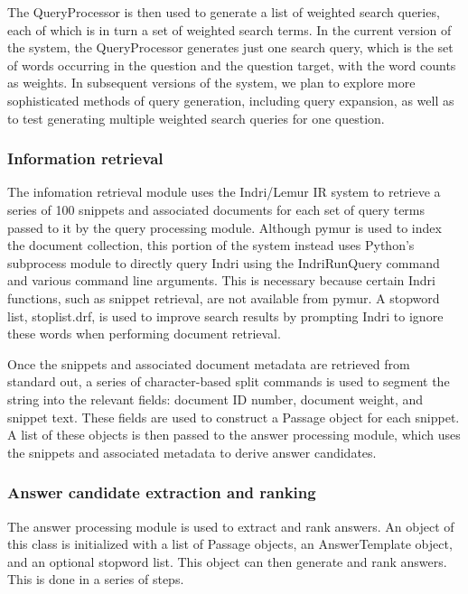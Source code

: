 \documentclass[11pt]{article}
\begin{document}
The QueryProcessor is then used to generate a list of weighted search queries, each of which is in turn a set of weighted search terms. In the current version of the system, the QueryProcessor generates just one search query, which is the set of words occurring in the question and the question target, with the word counts as weights. In subsequent versions of the system, we plan to explore more sophisticated methods of query generation, including query expansion, as well as to test generating multiple weighted search queries for one question.

\subsubsection{Information retrieval}

The infomation retrieval module uses the Indri/Lemur IR system to retrieve a series of 100 snippets and associated documents for each set of query terms passed to it by the query processing module. Although pymur is used to index the document collection, this portion of the system instead uses Python's subprocess module to directly query Indri using the IndriRunQuery command and various command line arguments. This is necessary because certain Indri functions, such as snippet retrieval, are not available from pymur. A stopword list, stoplist.drf, is used to improve search results by prompting Indri to ignore these words when performing document retrieval. 

Once the snippets and associated document metadata are retrieved from standard out, a series of character-based split commands is used to segment the string into the relevant fields: document ID number, document weight, and snippet text. These fields are used to construct a Passage object for each snippet. A list of these objects is then passed to the answer processing module, which uses the snippets and associated metadata to derive answer candidates.   

\subsubsection{Answer candidate extraction and ranking}

The answer processing module is used to extract and rank answers.  An object of this class is initialized with a list of Passage objects, an AnswerTemplate object, and an optional stopword list.  This object can then generate and rank answers.  This is done in a series of steps.
\end{document}
